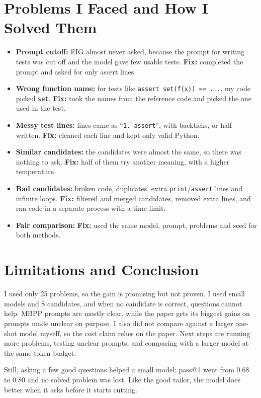 \documentclass[11pt]{article}
\begin{document}
\section{Problems I Faced and How I Solved Them}
\begin{itemize}[leftmargin=*, itemsep=2pt]
\item \textbf{Prompt cutoff:} EIG almost never asked, because the prompt for writing tests was cut off and the model gave few usable tests. \textbf{Fix:} completed the prompt and asked for only assert lines.
\item \textbf{Wrong function name:} for tests like \texttt{assert set(f(x)) == ...}, my code picked \texttt{set}. \textbf{Fix:} took the names from the reference code and picked the one used in the test.
\item \textbf{Messy test lines:} lines came as ``\texttt{1. assert}'', with backticks, or half written. \textbf{Fix:} cleaned each line and kept only valid Python.
\item \textbf{Similar candidates:} the candidates were almost the same, so there was nothing to ask. \textbf{Fix:} half of them try another meaning, with a higher temperature.
\item \textbf{Bad candidates:} broken code, duplicates, extra \texttt{print}/\texttt{assert} lines and infinite loops. \textbf{Fix:} filtered and merged candidates, removed extra lines, and ran code in a separate process with a time limit.
\item \textbf{Fair comparison:} \textbf{Fix:} used the same model, prompt, problems and seed for both methods.
\end{itemize}

\section{Limitations and Conclusion}
I used only 25 problems, so the gain is promising but not proven. I used small models and 8 candidates, and when no candidate is correct, questions cannot help. MBPP prompts are mostly clear, while the paper gets its biggest gains on prompts made unclear on purpose. I also did not compare against a larger one-shot model myself, so the cost claim relies on the paper. Next steps are running more problems, testing unclear prompts, and comparing with a larger model at the same token budget.

Still, asking a few good questions helped a small model: pass@1 went from 0.68 to 0.80 and no solved problem was lost. Like the good tailor, the model does better when it asks before it starts cutting.
\end{document}
